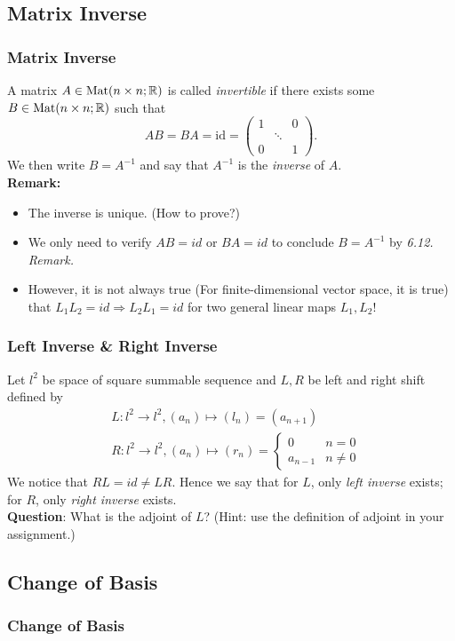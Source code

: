 \documentclass[12pt, t]{beamer}
\renewcommand{\emph}[1]{{\color{Turquoise3}\textsl{#1}}}
\newcommand{\nullspace}{~\\[15pt]}
\newcommand{\remark}{\textbf{Remark: }}
\begin{document}
\subsection{Matrix Inverse}
\begin{frame}
    \frametitle{Matrix Inverse}
    A matrix $A\in\text{Mat}(n\times n;\mathbb{R})$ is called \emph{invertible} if there exists some $B\in\text{Mat}(n\times n;\mathbb{R})$ such that
    \begin{equation}\label{eq19}
        AB=BA=\text{id}=\begin{pmatrix}
            1 &        & 0 \\
              & \ddots &   \\
            0 &        & 1
        \end{pmatrix}.
    \end{equation}
    We then write $B=A^{-1}$ and say that $A^{-1}$ is the \emph{inverse} of $A$.\\
    \small
    \remark
    \begin{itemize}
        \item The inverse is unique. (How to prove?)
        \item We only need to verify $AB=id$ or $BA=id$ to conclude $B=A^{-1}$ by \textit{6.12. Remark.}
        \item However, it is not always true (For finite-dimensional vector space, it is true) that $L_1L_2=id\Rightarrow L_2L_1=id$ for two general linear maps $L_1,L_2$!
    \end{itemize}
\end{frame}

\begin{frame}
    \frametitle{Left Inverse \& Right Inverse}
    Let $l^2$ be space of square summable sequence and $L,R$ be left and right shift defined by
    $$
        \begin{aligned}
             & L:l^2\rightarrow l^2, (a_n)\mapsto(l_n)=(a_{n+1})\\
             & R:l^2\rightarrow l^2, (a_n)\mapsto(r_n)=\begin{cases}
                0 & n=0  \\
                a_{n-1} & n\neq 0
            \end{cases}
        \end{aligned}
    $$
    We notice that $RL=id\neq LR$. Hence we say that for $L$, only \textit{left inverse} exists; for $R$, only \textit{right inverse} exists.\nullspace
    \textbf{Question}: What is the adjoint of $L$? (Hint: use the definition of adjoint in your assignment.)
\end{frame}

\subsection{Change of Basis}
\begin{frame}
    \frametitle{Change of Basis}

\end{frame}
\end{document}

